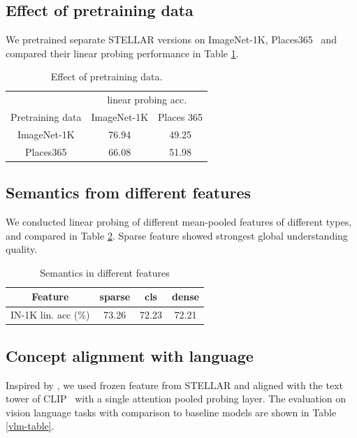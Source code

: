 \subsection{Effect of pretraining data} 
We pretrained separate STELLAR versions on ImageNet-1K, Places365~\citep{zhou2017places} and compared their linear probing performance in Table \ref{data-table}.
\begin{table}[ht]
\caption{Effect of pretraining data.}
\label{data-table}
\begin{center}
\begin{tabular}{c|cc}
& \multicolumn{2}{c}{linear probing acc.} \\
 Pretraining data & ImageNet-1K & Places 365 \\
\hline 
ImageNet-1K & 76.94 & 49.25 \\
Places365 & 66.08 & 51.98
\end{tabular}
\end{center}
\end{table}

\subsection{Semantics from different features} 
We conducted linear probing of different mean-pooled features of different types, and compared in Table \ref{feat-table}. Sparse feature showed strongest global understanding quality.
\begin{table}[ht]
\caption{Semantics in different features}
\label{feat-table}
\begin{center}
\begin{tabular}{c|ccc}
 Feature & sparse & cls & dense \\
\hline 
IN-1K lin. acc (\%) & 73.26 & 72.23 & 72.21 
\end{tabular}
\end{center}
\end{table}


\subsection{Concept alignment with language}
Inspired by \cite{zhang2025assessing}, we used frozen feature from STELLAR and aligned with the text tower of CLIP~\citep{radford2021learning} with a single attention pooled probing layer. The evaluation on vision language tasks with comparison to baseline models are shown in Table \ref{vlm-table}.

